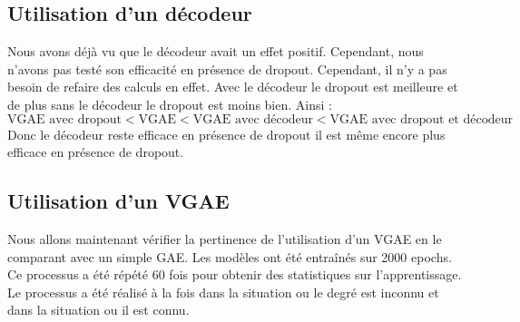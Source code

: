 \documentclass{article}
\begin{document}
\subsection{Utilisation d'un décodeur}
Nous avons déjà vu que le décodeur avait un effet positif. Cependant, nous n'avons pas testé son efficacité en présence de dropout. Cependant, il n'y a pas besoin de refaire des calculs en effet. Avec le décodeur le dropout est meilleure et de plus sans le décodeur le dropout est moins bien. Ainsi : 
\[
    \text{VGAE avec dropout} < \text{VGAE} < \text{VGAE avec décodeur} < \text{VGAE avec dropout et décodeur}
\]
Donc le décodeur reste efficace en présence de dropout il est même encore plus efficace en présence de dropout.
\subsection{Utilisation d'un VGAE}
Nous allons maintenant vérifier la pertinence de l'utilisation d'un VGAE en le comparant avec un simple GAE. 
Les modèles ont été entraînés sur 2000 epochs. 
Ce processus a été répété 60 fois pour obtenir des statistiques sur l'apprentissage.
Le processus a été réalisé à la fois dans la situation ou le degré est inconnu et dans la situation ou il est connu.
\end{document}
